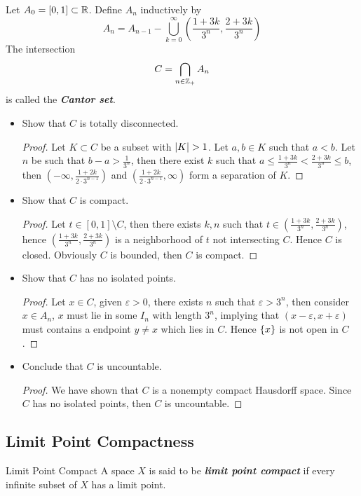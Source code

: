 \documentclass[12pt,a4paper]{article}
\begin{document}
    \begin{ex}
        Let $A_0=[0,1]\subset\mathbb{R}$. Define $A_n$ inductively by 
        $$
        A_n=A_{n-1}-\bigcup_{k=0}^\infty\left(\frac{1+3k}{3^n},\frac{2+3k}{3^n}\right)
        $$
        The intersection
        $$
        C=\bigcap_{n\in\mathbb{Z}_+}A_n
        $$
        is called the \textit{\textbf{Cantor set}}.
        \begin{itemize}
            \item Show that $C$ is totally disconnected.
            \begin{proof}
                Let $K\subset C$ be a subset with $\left\lvert K\right\rvert>1$. Let $a,b\in K$ such that $a<b$. Let $n$ be such that $b-a>\frac{1}{3^n}$, then there exist $k$ such that $a\leq\frac{1+3k}{3^n}<\frac{2+3k}{3^n}\leq b$, then $(-\infty,\frac{1+2k}{2\cdot 3^{n-1}})$ and $(\frac{1+2k}{2\cdot 3^{n-1}},\infty)$ form a separation of $K$.
            \end{proof}
            \item Show that $C$ is compact.
            \begin{proof}
                Let $t\in[0,1]\setminus C$, then there exists $k,n$ such that $t\in(\frac{1+3k}{3^n},\frac{2+3k}{3^n})$, hence $(\frac{1+3k}{3^n},\frac{2+3k}{3^n})$ is a neighborhood of $t$ not intersecting $C$. Hence $C$ is closed. Obviously $C$ is bounded, then $C$ is compact.
            \end{proof}
            \item Show that $C$ has no isolated points.
            \begin{proof}
                Let $x\in C$, given $\varepsilon>0$, there exists $n$ such that $\varepsilon>3^n$, then consider $x\in A_n$, $x$ must lie in some $I_n$ with length $3^n$, implying that $(x-\varepsilon,x+\varepsilon)$ must contains a endpoint $y\neq x$ which lies in $C$. Hence $\left\{x\right\}$ is not open in $C$.
            \end{proof}
            \item Conclude that $C$ is uncountable.
            \begin{proof}
                We have shown that $C$ is a nonempty compact Hausdorff space. Since $C$ has no isolated points, then $C$ is uncountable.
            \end{proof}
        \end{itemize}
    \end{ex}
    \hfill

    \subsection{Limit Point Compactness}
    \begin{defi}{Limit Point Compact}
        A space $X$ is said to be \textbf{\textit{limit point compact}} if every infinite subset of $X$ has a limit point.
    \end{defi}
    \hfill
\end{document}
